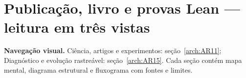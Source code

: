 \clearpage\section{Publicação, livro e provas Lean — leitura em três vistas}\label{arch:AR18}




\begin{descricao}\textbf{Navegação visual.} Ciência, artigos e experimentos: seção~\ref{arch:AR11}; Diagnóstico e evolução rastreável: seção~\ref{arch:AR15}. Cada seção contém mapa mental, diagrama estrutural e fluxograma com fontes e limites.\end{descricao}


